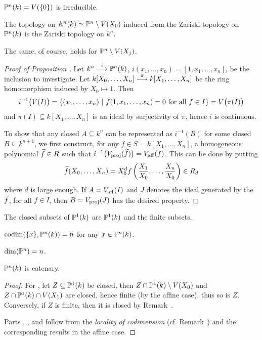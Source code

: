 \documentclass[a4paper,parskip=half,numbers=enddot, DIV=12]{scrreprt}
\begin{document}
\begin{cor*}
$\mathbb{P}^n(k) = V(\{0\})$ is irreducible.
\end{cor*}
\begin{prop}
The topology on $\mathbb{A}^n(k) \simeq \mathbb{P}^n\setminus V(X_0)$ induced from the Zariski topology on $\mathbb{P}^n(k)$ is the Zariski topology on $k^n$.
\end{prop}
\begin{rem*}
The same, of course, holds for $\mathbb{P}^n\setminus V(X_j)$.
\end{rem*}
\begin{proof}[Proof of Proposition ]
Let $k^n\morphism[i]\IP^n(k)$, $i(x_1,\ldots,x_n) = [1,x_1,\ldots,x_n]$, be the inclusion to investigate. Let $k[X_0,\ldots,X_n]\morphism[\pi]k[X_1,\ldots,X_n]$ be the ring homomorphism induced by $X_0\mapsto 1$. Then 
\begin{align*}
	i^{-1}\big(V(I)\big)=\left\{(x_1,\ldots,x_n) \ \middle|\  f(1,x_1,\ldots,x_n) = 0\text{ for all }f\in I\right\}=V\big(\pi(I)\big)
\end{align*}
and $\pi(I)\subseteq k[X_1,\ldots,X_n]$ is an ideal by surjectivity of $\pi$, hence $i$ is continuous.

To show that any closed $A\subseteq k^n$ can be represented as $i^{-1}(B)$ for some closed $B\subseteq k^{n+1}$, we first construct,
for any $f\in S = k[X_1,\ldots,X_n]$, a homogeneous polynomial $\snake f\in R$ such that $i^{-1}\big(V_\proj(\snake f)\big) = V_\aff(f)$.
This can be done by putting \begin{align*}
\snake f (X_0,\ldots,X_n)  = X_0^d f\left(\frac{X_1}{X_0},\ldots,\frac{X_n}{X_0}\right) \in R_d
\end{align*}
where $d$ is large enough. If $A = V_{\mathrm{aff}}(I)$ and $J$ denotes the ideal generated by the $\snake f$, for all $f\in I$,
then $B = V_{\mathrm{proj}}(J)$ has the desired property.
\end{proof}
\begin{cor}
\begin{alphanumerate}
\item The closed subsets of $\mathbb{P}^1(k)$ are $\mathbb{P}^1(k)$ and the finite subsets.
\item $\operatorname{codim}(\{x\},\mathbb{P}^n(k)) = n$ for any $x\in \mathbb{P}^n(k)$.
\item $\dim(\mathbb{P}^n)=n$.
\item $\mathbb{P}^n(k)$ is catenary.
\end{alphanumerate}
\end{cor}
\begin{proof}
	For , let $Z\subseteq\mathbb{P}^1(k)$ be closed, then $Z\cap\mathbb{P}^1(k)\setminus V(X_0)$ and $Z\cap \mathbb{P}^1(k)\cap V(X_1)$ are closed, hence finite (by the affine case), thus so is $Z$. Conversely, if $Z$ is finite, then it is closed by Remark~.
	
	Parts , , and  follow from the \emph{locality of codimension} (cf. Remark~) and the corresponding results in the affine case.
\end{proof}
\end{document}
